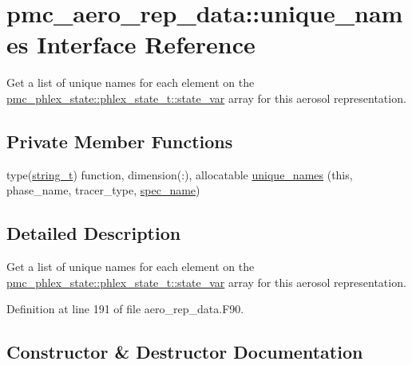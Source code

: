 \hypertarget{interfacepmc__aero__rep__data_1_1unique__names}{}\section{pmc\+\_\+aero\+\_\+rep\+\_\+data\+:\+:unique\+\_\+names Interface Reference}
\label{interfacepmc__aero__rep__data_1_1unique__names}


Get a list of unique names for each element on the {\ttfamily \mbox{\hyperlink{structpmc__phlex__state_1_1phlex__state__t_a78835cb552d483ebbfc7a6bc6f756918}{pmc\+\_\+phlex\+\_\+state\+::phlex\+\_\+state\+\_\+t\+::state\+\_\+var}}} array for this aerosol representation.  


\subsection*{Private Member Functions}
\begin{DoxyCompactItemize}
\item 
type(\mbox{\hyperlink{structpmc__util_1_1string__t}{string\+\_\+t}}) function, dimension(\+:), allocatable \mbox{\hyperlink{interfacepmc__aero__rep__data_1_1unique__names_ae30411d96309f8b50f38279c4385463a}{unique\+\_\+names}} (this, phase\+\_\+name, tracer\+\_\+type, \mbox{\hyperlink{interfacepmc__aero__rep__data_1_1spec__name}{spec\+\_\+name}})
\end{DoxyCompactItemize}


\subsection{Detailed Description}
Get a list of unique names for each element on the {\ttfamily \mbox{\hyperlink{structpmc__phlex__state_1_1phlex__state__t_a78835cb552d483ebbfc7a6bc6f756918}{pmc\+\_\+phlex\+\_\+state\+::phlex\+\_\+state\+\_\+t\+::state\+\_\+var}}} array for this aerosol representation. 

Definition at line 191 of file aero\+\_\+rep\+\_\+data.\+F90.



\subsection{Constructor \& Destructor Documentation}
\mbox{\label{interfacepmc__aero__rep__data_1_1unique__names_ae30411d96309f8b50f38279c4385463a}} 
